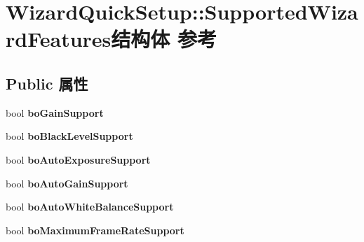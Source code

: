 \hypertarget{struct_wizard_quick_setup_1_1_supported_wizard_features}{\section{Wizard\+Quick\+Setup\+:\+:Supported\+Wizard\+Features结构体 参考}
\label{struct_wizard_quick_setup_1_1_supported_wizard_features}
}
\subsection*{Public 属性}
\begin{DoxyCompactItemize}
\item 
\hypertarget{struct_wizard_quick_setup_1_1_supported_wizard_features_a05381c7d8938a831f9919e83f1ccc9a2}{bool {\bfseries bo\+Gain\+Support}}\label{struct_wizard_quick_setup_1_1_supported_wizard_features_a05381c7d8938a831f9919e83f1ccc9a2}

\item 
\hypertarget{struct_wizard_quick_setup_1_1_supported_wizard_features_acc13c1485df1ed5942f556b03ef38773}{bool {\bfseries bo\+Black\+Level\+Support}}\label{struct_wizard_quick_setup_1_1_supported_wizard_features_acc13c1485df1ed5942f556b03ef38773}

\item 
\hypertarget{struct_wizard_quick_setup_1_1_supported_wizard_features_a8786266333984f422efbf276bddf5d7f}{bool {\bfseries bo\+Auto\+Exposure\+Support}}\label{struct_wizard_quick_setup_1_1_supported_wizard_features_a8786266333984f422efbf276bddf5d7f}

\item 
\hypertarget{struct_wizard_quick_setup_1_1_supported_wizard_features_ad6ef9358372424f6b91890981ce67bb4}{bool {\bfseries bo\+Auto\+Gain\+Support}}\label{struct_wizard_quick_setup_1_1_supported_wizard_features_ad6ef9358372424f6b91890981ce67bb4}

\item 
\hypertarget{struct_wizard_quick_setup_1_1_supported_wizard_features_a57c46f9d4821d5006fb0f189581bc229}{bool {\bfseries bo\+Auto\+White\+Balance\+Support}}\label{struct_wizard_quick_setup_1_1_supported_wizard_features_a57c46f9d4821d5006fb0f189581bc229}

\item 
\hypertarget{struct_wizard_quick_setup_1_1_supported_wizard_features_a3b363b55dbb8d6410f0164feda9ae2b7}{bool {\bfseries bo\+Maximum\+Frame\+Rate\+Support}}\label{struct_wizard_quick_setup_1_1_supported_wizard_features_a3b363b55dbb8d6410f0164feda9ae2b7}


\end{DoxyCompactItemize}
